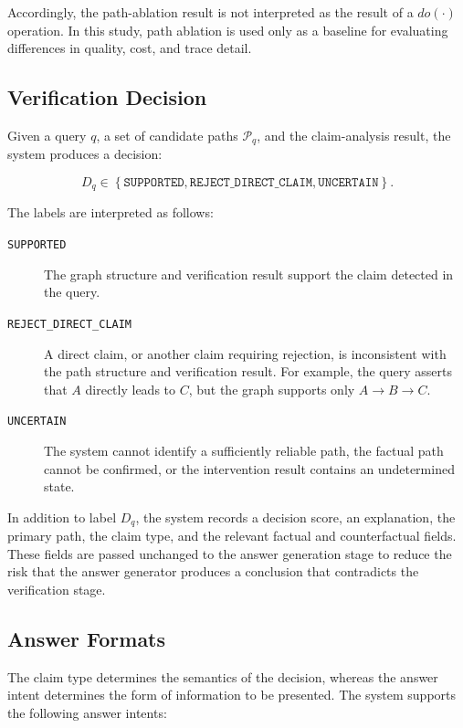 Accordingly, the path-ablation result is not interpreted as the result of a
\(do(\cdot)\) operation. In this study, path ablation is used only as a
baseline for evaluating differences in quality, cost, and trace detail.

\subsection{Verification Decision}

Given a query \(q\), a set of candidate paths \(\mathcal{P}_q\), and the
claim-analysis result, the system produces a decision:

\begin{equation}
D_q
\in
\left\{
    \texttt{SUPPORTED},
    \texttt{REJECT\_DIRECT\_CLAIM},
    \texttt{UNCERTAIN}
\right\}.
\end{equation}

The labels are interpreted as follows:

\begin{description}
    \item[\texttt{SUPPORTED}] The graph structure and verification result
    support the claim detected in the query.

    \item[\texttt{REJECT\_DIRECT\_CLAIM}] A direct claim, or another claim
    requiring rejection, is inconsistent with the path structure and
    verification result. For example, the query asserts that \(A\) directly
    leads to \(C\), but the graph supports only
    \(A \rightarrow B \rightarrow C\).

    \item[\texttt{UNCERTAIN}] The system cannot identify a sufficiently
    reliable path, the factual path cannot be confirmed, or the intervention
    result contains an undetermined state.
\end{description}

In addition to label \(D_q\), the system records a decision score, an
explanation, the primary path, the claim type, and the relevant factual and
counterfactual fields. These fields are passed unchanged to the answer
generation stage to reduce the risk that the answer generator produces a
conclusion that contradicts the verification stage.

\subsection{Answer Formats}

The claim type determines the semantics of the decision, whereas the answer
intent determines the form of information to be presented. The system
supports the following answer intents:

